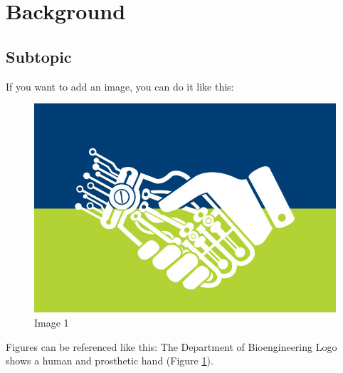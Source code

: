 \section{Background}

\subsection{Subtopic}
\lipsum[1]

\noindent If you want to add an image, you can do it like this:

\begin{figure}[H]
          \centering
          \includegraphics[width=1\linewidth]{img/bioeng.jpg}
          \caption{Image 1}
          \label{fig:1}
    \end{figure}
        
\noindent Figures can be referenced like this: The Department of Bioengineering Logo shows a human and prosthetic hand (Figure \ref{fig:1}).

